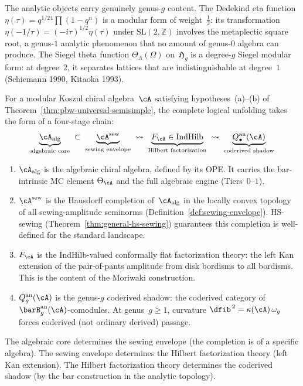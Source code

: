 \begin{remark}
The analytic objects carry genuinely genus-$g$ content.
The Dedekind eta function
$\eta(\tau) = q^{1/24}\prod(1-q^n)$
is a modular form of weight~$\tfrac{1}{2}$: its
transformation $\eta(-1/\tau) =
(-i\tau)^{1/2}\eta(\tau)$ under $\mathrm{SL}(2,\mathbb{Z})$
involves the metaplectic square root, a genus-$1$
analytic phenomenon that no amount of genus-$0$
algebra can produce.  The Siegel theta function
$\Theta_\Lambda(\Omega)$ on~$\mathfrak{H}_g$
is a degree-$g$ Siegel modular form: at degree~$2$,
it separates lattices that are indistinguishable at
degree~$1$ \textup{(}Schiemann 1990,
Kitaoka 1993\textup{)}.
\end{remark}

\begin{remark}
\label{rem:platonic-chain-theory}

For a modular Koszul chiral algebra~$\cA$
satisfying hypotheses~(a)--(b) of
Theorem~\ref{thm:pbw-universal-semisimple}, the
complete logical unfolding takes the form of a
four-stage chain:
\begin{equation}\label{eq:platonic-chain-theory}
\underbrace{\cA_{\mathrm{alg}}}_{\text{algebraic core}}
\;\subset\;
\underbrace{\cA^{\mathrm{sew}}}_{\text{sewing envelope}}
\;\rightsquigarrow\;
\underbrace{F_\cA \in \mathrm{IndHilb}}_{\text{Hilbert factorization}}
\;\rightsquigarrow\;
\underbrace{Q^{\mathrm{an}}_\bullet(\cA)}_{\text{coderived shadow}}
\end{equation}
\begin{enumerate}[label=\textup{(\roman*)}]
\item $\cA_{\mathrm{alg}}$ is the algebraic
  chiral algebra, defined by its OPE.  It carries the
  bar-intrinsic MC element $\Theta_\cA$ and the
  full algebraic engine (Tiers~$0$--$1$).
\item $\cA^{\mathrm{sew}}$ is the Hausdorff
  completion of~$\cA_{\mathrm{alg}}$ in the locally
  convex topology of all sewing-amplitude seminorms
  (Definition~\ref{def:sewing-envelope}).  HS-sewing
  (Theorem~\ref{thm:general-hs-sewing})
  guarantees this completion is well-defined for the
  standard landscape.
\item $F_\cA$ is the IndHilb-valued conformally flat
  factorization theory: the left Kan extension of the
  pair-of-pants amplitude from disk bordisms to all
  bordisms.  This is the
  content of the Moriwaki construction.
\item $Q^{\mathrm{an}}_g(\cA)$ is the genus-$g$
  coderived shadow: the coderived category of
  $\barB^{\mathrm{an}}_g(\cA)$-comodules.  At
  genus~$g \geq 1$, curvature
  $\dfib^{\,2} = \kappa(\cA)\,\omega_g$ forces
  coderived \textup{(}not ordinary derived\textup{)}
  passage.
\end{enumerate}
The algebraic core determines the sewing envelope
\textup{(}the completion is of a specific algebra\textup{)}.
The sewing envelope determines the Hilbert
factorization theory \textup{(}left Kan extension\textup{)}.
The Hilbert factorization theory determines the
coderived shadow \textup{(}by the bar construction
in the analytic topology\textup{)}.


\end{remark}
